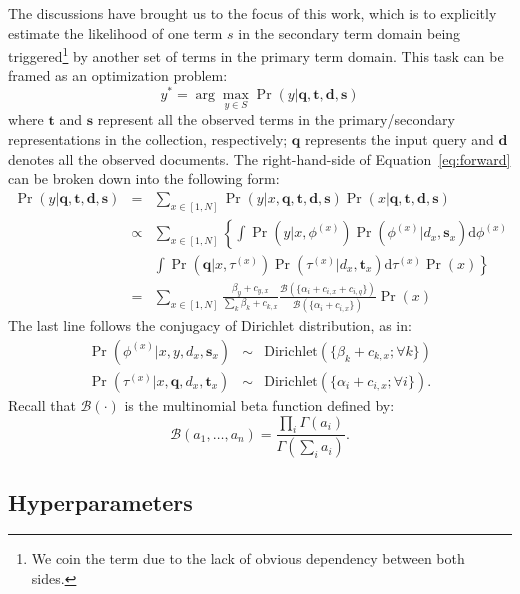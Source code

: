 The discussions have brought us to the focus of this work, which is to explicitly
estimate the likelihood of one term $s$ in the secondary term domain being
triggered\footnote{We coin the term due to the lack of obvious dependency
between both sides.} by another set of terms in the primary term
domain.  This task can be framed as an optimization problem:
\begin{equation} y^* = \arg\max_{y \in S} \Pr(y|\mathbf{q}, \mathbf{t},
\mathbf{d}, \mathbf{s}) \label{eq:forward} \end{equation} where $\mathbf{t}$
and $\mathbf{s}$ represent all the observed terms in the primary/secondary
representations in the collection, respectively; $\mathbf{q}$ represents
the input query and $\mathbf{d}$ denotes all the observed documents.  The 
right-hand-side of Equation~\eqref{eq:forward} can be broken down into the following form:
\begin{eqnarray}
  \Pr(y|\mathbf{q}, \mathbf{t}, \mathbf{d}, \mathbf{s}) 
  &=& \sum_{x \in [1, N]} \Pr(y|x, \mathbf{q}, \mathbf{t}, \mathbf{d}, \mathbf{s}) \Pr(x|\mathbf{q}, \mathbf{t}, \mathbf{d}, \mathbf{s}) \nonumber\\
  &\propto& \sum_{x \in [1, N]} \left\{ \int \Pr(y|x, \phi^{(x)}) \Pr(\phi^{(x)}|d_x, \mathbf{s}_x) \mathrm{d}\phi^{(x)} \right. \nonumber\\
  && \left. \int \Pr(\mathbf{q}| x, \tau^{(x)}) \Pr(\tau^{(x)}|d_x, \mathbf{t}_x)\mathrm{d}\tau^{(x)} \Pr(x) \right\} \nonumber\\
  &=& \sum_{x \in [1, N]} \frac{\beta_y + c_{y,x}}{\sum_k \beta_k + c_{k,x}} \frac{\mathcal{B}(\{\alpha_i + c_{i,x} + c_{i,q} \})}{\mathcal{B}(\{\alpha_i + c_{i,x} \})} \Pr(x) \label{eq:forward-solution}
\end{eqnarray}
The last line follows the conjugacy of Dirichlet distribution, as in:
\begin{eqnarray*}
\Pr(\phi^{(x)}|x, y, d_x,\mathbf{s}_x) &\sim& \mathrm{Dirichlet}(\{\beta_k + c_{k,x}; \forall k \}) \\
\Pr(\tau^{(x)}|x, \mathbf{q}, d_x, \mathbf{t}_x) &\sim& \mathrm{Dirichlet}(\{\alpha_i + c_{i,x}; \forall i \}).
\end{eqnarray*}
Recall that $\mathcal{B}(\cdot)$ is the multinomial beta
function defined by: \[\mathcal{B}(a_1, \ldots, a_n) = \frac{\prod_i
\Gamma(a_i)}{\Gamma(\sum_i a_i)}. \]

\subsection{Hyperparameters}

